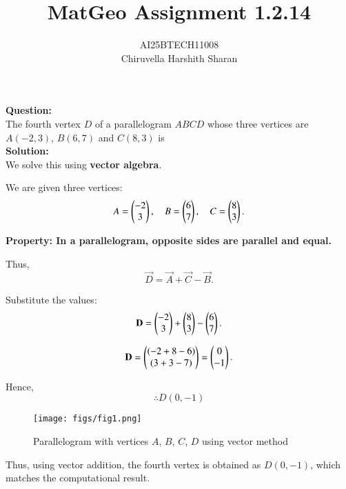 \documentclass[journal]{IEEEtran}
\begin{document}

\vspace{3cm}

\title{MatGeo Assignment 1.2.14}
\author{AI25BTECH11008 \\ Chiruvella Harshith Sharan}

\maketitle
{\let\newpage\relax\maketitle}

\renewcommand{\thefigure}{\theenumi}
\renewcommand{\thetable}{\theenumi}
\setlength{\intextsep}{10pt}

\renewcommand{\thetable}{\theenumi}

\noindent
\textbf{Question:}\\
The fourth vertex $D$ of a parallelogram $ABCD$ whose three vertices are 
$A(-2,3)$, $B(6,7)$ and $C(8,3)$ is \\
\noindent
\textbf{Solution:}\\
We solve this using \textbf{vector algebra}.  

We are given three vertices:  
\[
A = \begin{pmatrix}-2\\3\end{pmatrix}, \quad B = \begin{pmatrix}6\\7\end{pmatrix}, \quad C = \begin{pmatrix}8\\3\end{pmatrix}.
\]

\textbf{Property: In a parallelogram, opposite sides are parallel and equal.}  

Thus,  
\[
\vec{D} = \vec{A} + \vec{C} - \vec{B}.
\]

Substitute the values:  
\[
\mathbf{D} = \begin{pmatrix}-2\\3\end{pmatrix} + \begin{pmatrix}8\\3\end{pmatrix} - \begin{pmatrix}6\\7\end{pmatrix}.
\]

\[
\mathbf{D} = \begin{pmatrix}(-2+8-6) \\ (3+3-7)\end{pmatrix} = \begin{pmatrix}0 \\ -1\end{pmatrix}.
\]

Hence,  
\[
\therefore D(0,-1)
\]

\begin{figure}[H]
    \centering
    \texttt{[image: figs/fig1.png]}
    \caption{Parallelogram with vertices $A$, $B$, $C$, $D$ using vector method}
    \label{fig:figs/fig1.png}
\end{figure}

\noindent
Thus, using vector addition, the fourth vertex is obtained as $D(0,-1)$, which matches the computational result.
\end{document}
